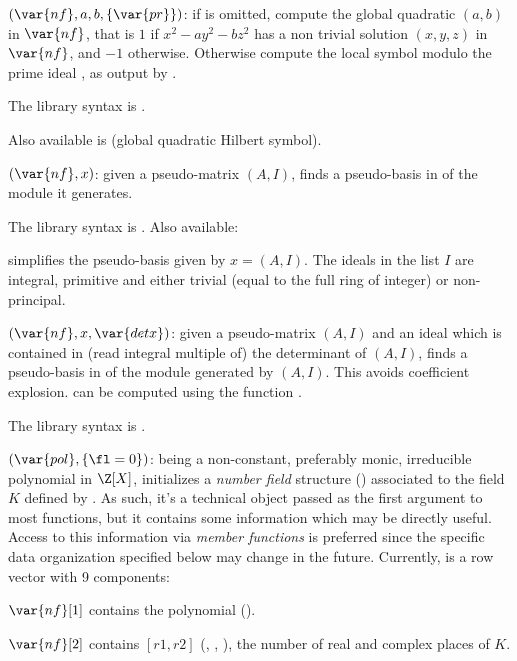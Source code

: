 $(\var{nf},a,b,\{\var{pr}\})$: \label{se:nfhilbert}if  is omitted,
compute the global quadratic  $(a,b)$ in $\var{nf}$, that
is $1$ if $x^2 - a y^2 - b z^2$ has a non trivial solution $(x,y,z)$ in
$\var{nf}$, and $-1$ otherwise. Otherwise compute the local symbol modulo
the prime ideal , as output by .

The library syntax is .

Also available is  (global
quadratic Hilbert symbol).

$(\var{nf},x)$: \label{se:nfhnf}given a pseudo-matrix $(A,I)$, finds a
pseudo-basis in  of the module it generates.

The library syntax is .
Also available:

 simplifies the pseudo-basis
given by $x = (A,I)$. The ideals in the list $I$ are integral, primitive and
either trivial (equal to the full ring of integer) or non-principal.

$(\var{nf},x,\var{detx})$: \label{se:nfhnfmod}given a pseudo-matrix $(A,I)$
and an ideal  which is contained in (read integral multiple of) the
determinant of $(A,I)$, finds a pseudo-basis in 
of the module generated by $(A,I)$. This avoids coefficient explosion.
 can be computed using the function .

The library syntax is .

$(\var{pol},\{\fl=0\})$: \label{se:nfinit} being a non-constant,
preferably monic, irreducible polynomial in $\Z[X]$, initializes a
\emph{number field} structure () associated to the field $K$ defined
by . As such, it's a technical object passed as the first argument
to most  functions, but it contains some information which
may be directly useful. Access to this information via \emph{member
functions} is preferred since the specific data organization specified below
may change in the future. Currently,  is a row vector with 9
components:

$\var{nf}[1]$ contains the polynomial  ().

$\var{nf}[2]$ contains $[r1,r2]$ (, ,
), the number of real and complex places of $K$.


